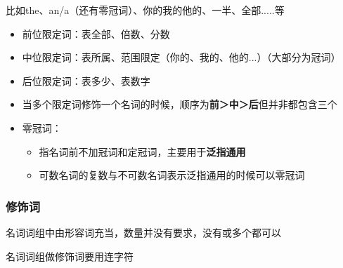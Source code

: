 \documentclass{ctexart}
\begin{document}
        比如the、an/a（还有零冠词）、你的我的他的、一半、全部.....等
            \begin{itemize}
                \item[1)] 前位限定词：表全部、倍数、分数
                \item[2)] 中位限定词：表所属、范围限定（你的、我的、他的...）（大部分为冠词）
                \item[3)] 后位限定词：表多少、表数字
                \item[4)] 当多个限定词修饰一个名词的时候，顺序为\textbf{前＞中＞后}但并非都包含三个
                \item[5)] 零冠词：
                    \begin{itemize}
                        \item[(1)] 指名词前不加冠词和定冠词，主要用于\textbf{泛指通用}
                        \item[1)] 可数名词的复数与不可数名词表示泛指通用的时候可以零冠词
                    \end{itemize}
            \end{itemize}
        \subsubsection{修饰词}
        名词词组中由形容词充当，数量并没有要求，没有或多个都可以

        名词词组做修饰词要用连字符
\end{document}
